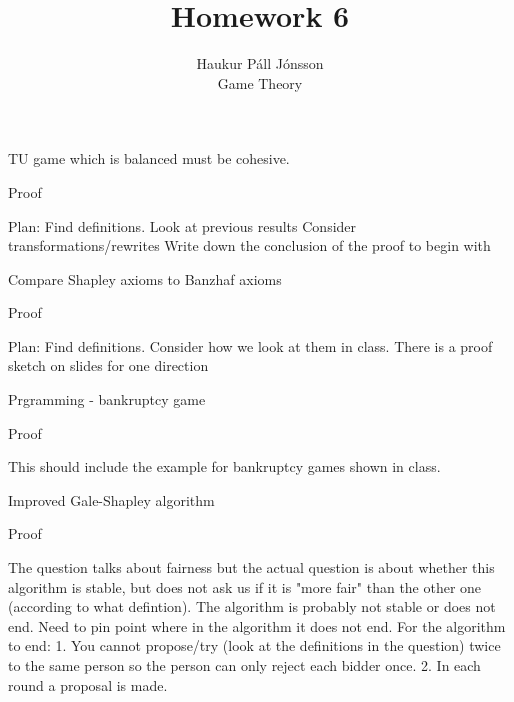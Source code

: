 \documentclass[12pt]{article}
\newenvironment{question}[2][Question]{\begin{trivlist}
\item[\hskip \labelsep {\bfseries #1}\hskip \labelsep {\bfseries #2.}]}{\end{trivlist}}
\newenvironment{answer}[2][Answer]{\begin{trivlist}
\item[\hskip \labelsep {\bfseries #1}\hskip \labelsep {\bfseries #2:}]}{\end{trivlist}}
\begin{document}
\let\oldsum\sum
\renewcommand{\sum}[3]{\oldsum\limits_{#1}^{#2}#3}
\let\oldprod\prod
\renewcommand{\prod}[3]{\oldprod\limits_{#1}^{#2}#3}

\title{Homework 6}
\author{Haukur Páll Jónsson\\
Game Theory}

\maketitle

\begin{question}{1}
TU game which is balanced must be cohesive.
\end{question}
\begin{answer}{a)}{Proof}

Plan: Find definitions.
Look at previous results
Consider transformations/rewrites
Write down the conclusion of the proof to begin with
\end{answer}

\begin{question}{2}
Compare Shapley axioms to Banzhaf axioms
\end{question}
\begin{answer}{a)}{Proof}

Plan: Find definitions.
Consider how we look at them in class. There is a proof sketch on slides for one direction
\end{answer}

\begin{question}{3}
Prgramming - bankruptcy game
\end{question}
\begin{answer}{a)}{Proof}

This should include the example for bankruptcy games shown in class.
\end{answer}

\begin{question}{5}
Improved Gale-Shapley algorithm
\end{question}
\begin{answer}{a)}{Proof}

The question talks about fairness but the actual question is about whether this algorithm is stable, but does not ask us if it is "more fair" than the other one (according to what defintion).
The algorithm is probably not stable or does not end.
Need to pin point where in the algorithm it does not end.
For the algorithm to end:
1. You cannot propose/try (look at the definitions in the question) twice to the same person so the person can only reject each bidder once.
2. In each round a proposal is made.

\end{answer}
\end{document}
